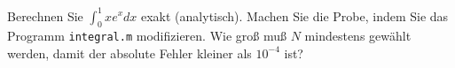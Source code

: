 \begin{aufg}[0]
Berechnen Sie $\int_0^1 xe^x dx$ exakt (analytisch). Machen Sie die
  Probe, indem Sie das Programm \lstinline!integral.m! modifizieren. Wie
  groß muß $N$ mindestens gewählt werden, damit der absolute Fehler
  kleiner als $10^{-4}$ ist?
\end{aufg}